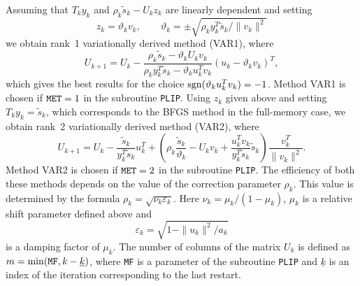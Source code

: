 \documentclass{esub2acm}
\newcommand{\bd}{\begin{displaymath}}
\newcommand{\ed}{\end{displaymath}}
\begin{document}
Assuming that $T_k y_k$ and $\rho_k \tilde{s}_k - U_k z_k$ are linearly
dependent and setting
%
\bd
\label{28}
z_k = \vartheta_k v_k, \qquad
\vartheta_k = \pm \sqrt{\rho_k y_k^T \tilde{s}_k / \|v_k\|^2}
\ed
%
we obtain rank~1 variationally derived method (VAR1), where
%
\bd
\label{29}
U_{k+1} = U_k - \frac{\rho_k \tilde{s}_k - \vartheta_k U_k v_k}
{\rho_k y_k^T \tilde{s}_k - \vartheta_k u_k^T v_k}
\left(u_k - \vartheta_k v_k \right)^T,
\ed
%
which gives the best results for the choice ${\rm sgn}(\vartheta_k u_k^T v_k) = -1$.
Method VAR1 is chosen if ${\tt MET}=1$ in the subroutine {\tt PLIP}.
Using $z_k$ given above and setting $T_k y_k = \tilde{s}_k$,
which corresponds to the BFGS method in the full-memory case, we obtain
rank~2 variationally derived method (VAR2), where
%
\bd
\label{30}
U_{k+1} = U_k - \frac{\tilde{s}_k}{y_k^T \tilde{s}_k} u_k^T +
\left(\rho_k \frac{\tilde{s}_k}{\vartheta_k} - U_k v_k +
\frac{u_k^T v_k}{y_k^T \tilde{s}_k} \tilde{s}_k \right) \frac{v_k^T}
{\|v_k\|^2}.
\ed
%
Method VAR2 is chosen if ${\tt MET}=2$ in the subroutine {\tt PLIP}.
The efficiency of both these methods depends on the value of the correction parameter
$\rho_k$. This value is determined by the formula
$\rho_k = \sqrt{\nu_k \varepsilon_k}$.  Here $\nu_k = \mu_k / (1 - \mu_k)$,
$\mu_k$ is a relative shift parameter defined above and
%
$$\varepsilon_k = \sqrt{1 - \|u_k\|^2 / a_k}$$
%
is a damping factor of $\mu_k$. The number of columns of the matrix
$U_k$ is defined as $m = \min({\tt MF}, k-\underline{k})$, where
{\tt MF} is a parameter of the subroutine {\tt PLIP} and $\underline{k}$
is an index of the iteration corresponding to the last restart.

\vspace{5mm}


\vspace{3mm}
\end{document}
